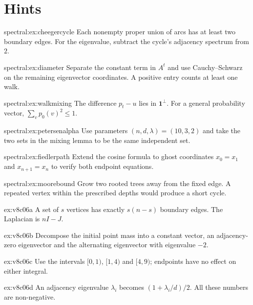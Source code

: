 \section{Hints}
\begin{hint}{spectral:ex:cheegercycle}
Each nonempty proper union of arcs has at least two boundary edges. For the eigenvalue, subtract the cycle's adjacency spectrum from $2$.
\end{hint}
\begin{hint}{spectral:ex:diameter}
Separate the constant term in $A^t$ and use Cauchy--Schwarz on the remaining eigenvector coordinates. A positive entry counts at least one walk.
\end{hint}
\begin{hint}{spectral:ex:walkmixing}
The difference $p_t-u$ lies in $\mathbf1^\perp$. For a general probability vector, $\sum_vp_0(v)^2\le1$.
\end{hint}
\begin{hint}{spectral:ex:petersenalpha}
Use parameters $(n,d,\lambda)=(10,3,2)$ and take the two sets in the mixing lemma to be the same independent set.
\end{hint}
\begin{hint}{spectral:ex:fiedlerpath}
Extend the cosine formula to ghost coordinates $x_0=x_1$ and $x_{n+1}=x_n$ to verify both endpoint equations.
\end{hint}
\begin{hint}{spectral:ex:moorebound}
Grow two rooted trees away from the fixed edge. A repeated vertex within the prescribed depths would produce a short cycle.
\end{hint}
\begin{hint}{ex:v8c06a}
A set of $s$ vertices has exactly $s(n-s)$ boundary edges. The Laplacian is $nI-J$.
\end{hint}
\begin{hint}{ex:v8c06b}
Decompose the initial point mass into a constant vector, an adjacency-zero eigenvector and the alternating eigenvector with eigenvalue $-2$.
\end{hint}
\begin{hint}{ex:v8c06c}
Use the intervals $[0,1)$, $[1,4)$ and $[4,9)$; endpoints have no effect on either integral.
\end{hint}
\begin{hint}{ex:v8c06d}
An adjacency eigenvalue $\lambda_i$ becomes $(1+\lambda_i/d)/2$. All these numbers are non-negative.
\end{hint}

